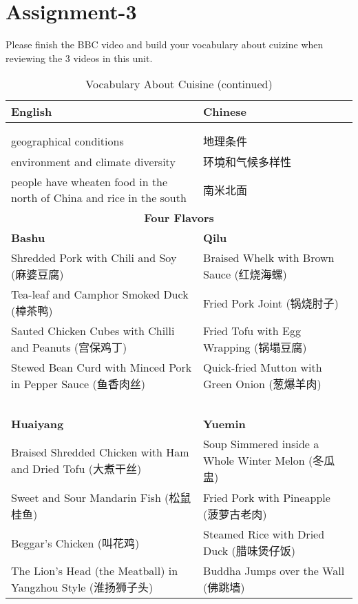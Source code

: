 \section{Assignment-3}

\begin{question}{}{}
    Please finish the BBC video and build your vocabulary about cuizine when reviewing the 3 videos in this unit.
\end{question}

\begin{longtable}{|p{7cm}|p{7cm}|}
    \caption{Vocabulary About Cuisine} \label{tab:vocab_cuisine} \\
    \hline
    \textbf{English} & \textbf{Chinese} \\
    \hline
    \endfirsthead
    
    \caption[]{Vocabulary About Cuisine (continued)} \\
    \hline
    
    \endhead
    
    \hline
    \endfoot
    
    \hline
    \endlastfoot
    
    \multicolumn{2}{c}{\textbf{Influencing Factors}} \\ \hline
    geographical conditions & 地理条件 \\ \hline
    environment and climate diversity & 环境和气候多样性 \\ \hline
    people have wheaten food in the north of China and rice in the south & 南米北面 \\ \hline
    
    \multicolumn{2}{c}{\textbf{Four Flavors}} \\ \hline
    \textbf{Bashu} & \textbf{Qilu} \\ \hline
    Shredded Pork with Chili and Soy (麻婆豆腐) & Braised Whelk with Brown Sauce (红烧海螺) \\ \hline
    Tea-leaf and Camphor Smoked Duck (樟茶鸭) & Fried Pork Joint (锅烧肘子) \\ \hline
    Sauted Chicken Cubes with Chilli and Peanuts (宫保鸡丁) & Fried Tofu with Egg Wrapping (锅塌豆腐) \\ \hline
    Stewed Bean Curd with Minced Pork in Pepper Sauce (鱼香肉丝) & Quick-fried Mutton with Green Onion (葱爆羊肉) \\ \hline
    ~ & ~ \\ \hline
    \textbf{Huaiyang} & \textbf{Yuemin} \\ \hline
    Braised Shredded Chicken with Ham and Dried Tofu (大煮干丝) & Soup Simmered inside a Whole Winter Melon (冬瓜盅) \\ \hline
    Sweet and Sour Mandarin Fish (松鼠桂鱼) & Fried Pork with Pineapple (菠萝古老肉) \\ \hline
    Beggar's Chicken (叫花鸡) & Steamed Rice with Dried Duck (腊味煲仔饭) \\ \hline
    The Lion’s Head (the Meatball) in Yangzhou Style (淮扬狮子头) & Buddha Jumps over the Wall (佛跳墙) \\ \hline
    

\end{longtable}
